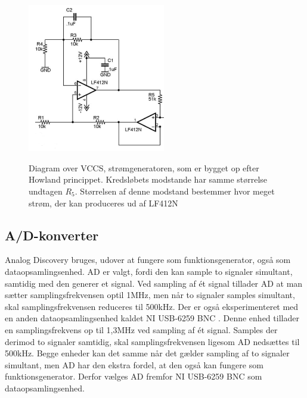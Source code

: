 \begin{figure}[H]
\centering
{\includegraphics[width=6cm]
{Figure/howland1}}
\caption{Diagram over VCCS, strømgeneratoren, som er bygget op efter Howland princippet. Kredsløbets modstande har samme størrelse undtagen ${R_{5}}$. Størrelsen af denne modstand bestemmer hvor meget strøm, der kan produceres ud af LF412N  }
\label{fig:howland1}
\end{figure}







\subsection{A/D-konverter}

Analog Discovery bruges, udover at fungere som funktionsgenerator, også som dataopsamlingsenhed. AD er valgt, fordi den kan sample to signaler simultant, samtidig med den generer et signal. Ved sampling af ét signal tillader AD at man sætter samplingsfrekvensen optil 1MHz, men når to signaler samples simultant, skal samplingsfrekvensen reduceres til 500kHz. 
Der er også eksperimenteret med en anden dataopsamlingsenhed kaldet NI USB-6259 BNC \cite{NI}. Denne enhed tillader en  samplingsfrekvens op til 1,3MHz ved sampling af ét signal. Samples der derimod to signaler samtidig, skal samplingsfrekvensen ligesom AD nedsættes  til 500kHz. Begge enheder kan det samme når det gælder sampling af to signaler simultant, men AD har den ekstra fordel, at den også kan fungere som funktionsgenerator. Derfor vælges AD fremfor NI USB-6259 BNC som dataopsamlingsenhed.     


